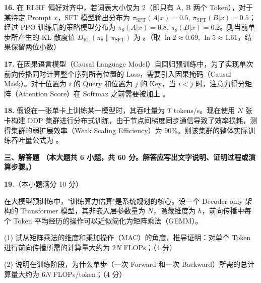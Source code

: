\documentclass[a4paper]{ctexart}
\newcommand{\bodyfont}{\fontsize{12pt}{16pt}\selectfont}
\begin{document}
\vspace{0.7em}

\noindent\textbf{16.} 在 RLHF 偏好对齐中，若词表大小仅为 2（即只有 A, B 两个 Token），对于某特定 Prompt $x$，SFT 模型输出分布为 $\pi_{\mathrm{SFT}}(A|x) = 0.5$, $\pi_{\mathrm{SFT}}(B|x) = 0.5$；经过 PPO 训练后的策略模型分布为 $\pi_{\theta}(A|x) = 0.8$, $\pi_{\theta}(B|x) = 0.2$。则当前单步所产生的 KL 散度值 $D_{\mathrm{KL}}(\pi_{\theta} \| \pi_{\mathrm{SFT}})$ 为 \underline{\hspace{2.5cm}}。（取 $\ln 2 \approx 0.69$, $\ln 5 \approx 1.61$，结果保留两位小数）

\vspace{0.7em}

\noindent\textbf{17.} 在因果语言模型（Causal Language Model）自回归预训练中，为了实现单次前向传播同时计算整个序列所有位置的 Loss，需要引入因果掩码（Causal Mask）。对于位置为 $i$ 的 Query 和位置为 $j$ 的 Key，当 $i < j$ 时，注意力得分矩阵（Attention Score）在 Softmax 之前需要被加上 \underline{\hspace{4.5cm}}。

\vspace{0.7em}

\noindent\textbf{18.} 假设在一张单卡上训练某一模型时，其吞吐量为 $T$ tokens/s。现在使用 $N$ 张卡构建 DDP 集群进行分布式训练，由于节点间梯度同步通信导致了效率损耗，测得集群的弱扩展效率（Weak Scaling Efficiency）为 90\%。则该集群的整体实际训练吞吐量公式为 \underline{\hspace{4.5cm}}。

\newpage

{\bodyfont\heiti\bfseries 三、解答题%
{\bodyfont\songti\bfseries （本大题共 6 小题，共 60 分。解答应写出文字说明、证明过程或演算步骤。）}}

\vspace{0.5em}

\noindent\textbf{19.}（本小题满分 10 分）

在大模型预训练中，"训练算力估算"是系统规划的核心。设一个 Decoder-only 架构的 Transformer 模型，其非嵌入层参数量为 $N$，隐藏维度为 $h$，前向传播中每个 Token 平均经历的操作可以近似简化为矩阵乘法（GEMM）。

\vspace{0.3em}
(1) 试从矩阵乘法的维度和乘加操作（MAC）的角度，推导证明：对单个 Token 进行前向传播所需的计算量大约为 $2N$ FLOPs；（4 分）

\vspace{0.3em}
(2) 说明在训练阶段，为什么单步（一次 Forward 和一次 Backward）所需的总计算量大约为 $6N$ FLOPs/token；（4 分）
\end{document}
